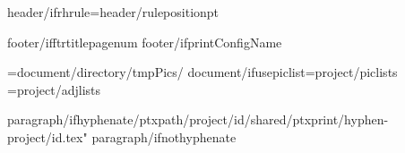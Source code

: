 
\def\HeaderPosition{{{header/headerposition}}}
\def\FooterPosition{{{header/footerposition}}}
{header/ifrhrule}\RHruleposition={header/ruleposition}pt
\def\RangeSeparator{{\kern.1em\char"2013\kern.1em}} %
\def\ChapterVerseSeparator{{\kern.02em{header/chvseparator}\kern.02em}} %

\def\RHoddleft{{{header/oddleft}}}
\def\RHoddcenter{{{header/oddcenter}}}
\def\RHoddright{{{header/oddright}}}

\def\RHevenleft{{{header/evenleft}}}
\def\RHevencenter{{{header/evencenter}}}
\def\RHevenright{{{header/evenright}}}


\def\RFoddcenter{{{footer/oddcenter}}}
\def\RFevencenter{{{footer/oddcenter}}}
\def\RFtitlecenter{{{footer/oddcenter}}}
{footer/ifftrtitlepagenum}\def\RFtitlecenter{{\pagenumber}}
{footer/ifprintConfigName}\def\RFtitlecenter{{{config/name}}}

\PicPath={{{document/directory}/tmpPics/}}
{document/ifusepiclist}\PicListPath={{{project/piclists}}}
\AdjListPath={{{project/adjlists}}}

\def\b{{\par\vskip\baselineskip}}
\let\pb=\pagebreak


{paragraph/ifhyphenate}{/ptxpath}/{project/id}/shared/ptxprint/hyphen-{project/id}.tex"
{paragraph/ifnothyphenate}


